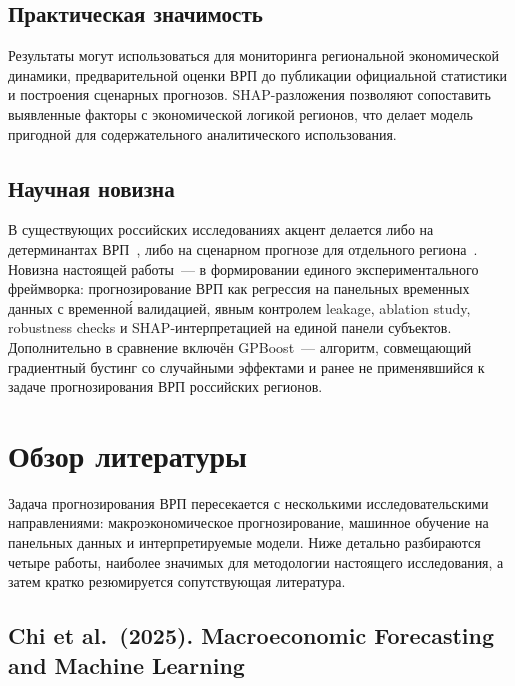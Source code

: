 \documentclass[12pt,a4paper]{article}
\begin{document}
\subsection{Практическая значимость}

Результаты могут использоваться для мониторинга региональной экономической
динамики, предварительной оценки ВРП до публикации официальной статистики
и построения сценарных прогнозов. SHAP-разложения позволяют сопоставить
выявленные факторы с экономической логикой регионов, что делает модель
пригодной для содержательного аналитического использования.

\subsection{Научная новизна}

В существующих российских исследованиях акцент делается либо на
детерминантах ВРП~\cite{badykova2026}, либо на сценарном прогнозе для
отдельного региона~\cite{malkina2025}. Новизна настоящей работы~--- в
формировании единого экспериментального фреймворка: прогнозирование ВРП
как регрессия на панельных временных данных с временно\'{й} валидацией,
явным контролем leakage, ablation study, robustness checks и
SHAP-интерпретацией на единой панели субъектов. Дополнительно в сравнение
включён GPBoost~--- алгоритм, совмещающий градиентный бустинг со случайными
эффектами и ранее не применявшийся к задаче прогнозирования ВРП российских
регионов.

\section{Обзор литературы}

Задача прогнозирования ВРП пересекается с несколькими исследовательскими
направлениями: макроэкономическое прогнозирование, машинное обучение на
панельных данных и интерпретируемые модели. Ниже детально разбираются
четыре работы, наиболее значимых для методологии настоящего исследования,
а затем кратко резюмируется сопутствующая литература.

\subsection{Chi et al.\ (2025). Macroeconomic Forecasting and
Machine Learning~\cite{chi2025}}
\end{document}
